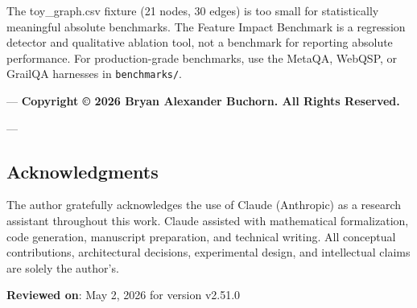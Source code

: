 The toy\_graph.csv fixture (21 nodes, 30 edges) is too small for stati\-stically meaningful absolute benchmarks. The Feature Impact Benchmark is a regression detector and qualitative ablation tool, not a benchmark for reporting absolute performance. For production-grade benchmarks, use the MetaQA, WebQSP, or GrailQA harnesses in \texttt{benchmarks/}.

---
\textbf{Copyright © 2026 Bryan Alexander Buchorn. All Rights Reserved.}

---
\subsection{Acknow\-ledgments}

The author gratefully ackno\-wledges the use of Claude (Anthropic) as a research assistant throughout this work. Claude assisted with mathe\-matical forma\-lization, code generation, manuscript preparation, and technical writing. All conceptual contr\-ibutions, archi\-tectural decisions, exper\-imental design, and intel\-lectual claims are solely the author's.

\textbf{Reviewed on}: May 2, 2026 for version v2.51.0
